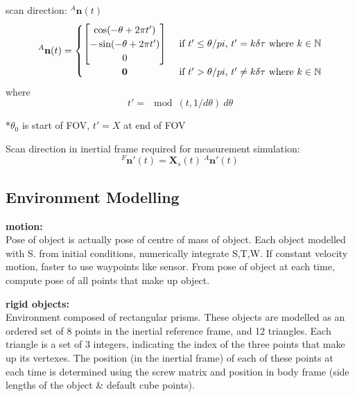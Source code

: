 scan direction: $^{A}\mathbf{n}(t)$
\begin{equation}
^{A}\mathbf{n}(t) =
	\begin{cases} 
	      \hfill \begin{bmatrix}
	      		\cos(-\theta + 2\pi t') \\
	      		-\sin(-\theta + 2\pi t') \\
	      		0
	      	\end{bmatrix}    \hfill & \text{ if $t' \leq \theta/pi$, $t' = k\delta\tau$ where $k \in \mathbb{N}$} \\
	      \hfill \mathbf{0} \hfill & \text{ if $t' > \theta/pi$, $t' \neq k\delta\tau$ where $k \in \mathbb{N}$} \\
	\end{cases} 
\end{equation}
where
\begin{equation}
t' = \mod(t,1/d\theta)\:d\theta
\end{equation}

*$\theta_0$ is start of FOV, $t'=X$ at end of FOV

Scan direction in inertial frame required for measurement simulation:
\begin{equation}
	{^{F}\mathbf{n'}(t)} = \mathbf{X}_s(t)\:{^{A}\mathbf{n'}(t)}
\end{equation}

\subsection{Environment Modelling}

\textbf{motion:}\\
Pose of object is actually pose of centre of mass of object.
Each object modelled with S. from initial conditions, numerically integrate S,T,W. If constant velocity motion, faster to use waypoints like sensor.
From pose of object at each time, compute pose of all points that make up object.

\textbf{rigid objects:}\\
Environment composed of rectangular prisms. These objects are modelled as an ordered set of 8 points in the inertial reference frame, and 12 triangles. Each triangle is a set of 3 integers, indicating the index of the three points that make up its vertexes.
The position (in the inertial frame) of each of these points at each time is determined using the screw matrix and position in body frame (side lengths of the object \& default cube points).

